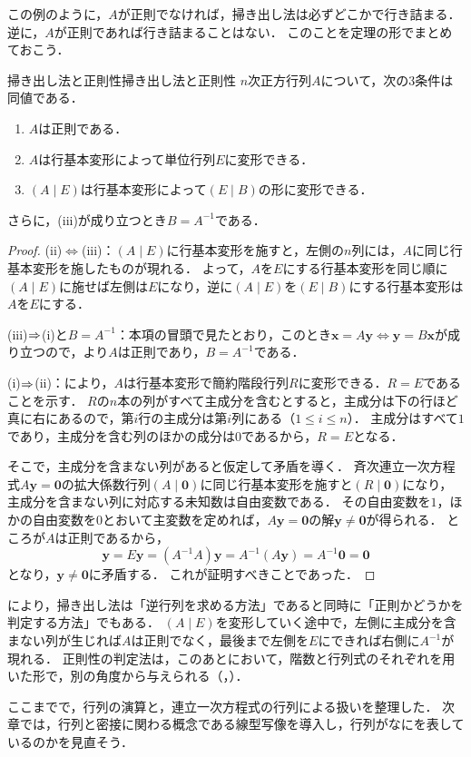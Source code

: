 この例のように，$A$が正則でなければ，掃き出し法は必ずどこかで行き詰まる．
逆に，$A$が正則であれば行き詰まることはない．
このことを定理の形でまとめておこう．

\begin{theorem}{掃き出し法と正則性}{掃き出し法と正則性}
  $n$次正方行列$A$について，次の$3$条件は同値である．
  \begin{enumerate}[label=(\roman*),leftmargin=3.2em]
    \item $A$は正則である．
    \item $A$は行基本変形によって単位行列$E$に変形できる．
    \item $(A \mid E)$は行基本変形によって$(E \mid B)$の形に変形できる．
  \end{enumerate}
  さらに，(iii)が成り立つとき$B = A^{-1}$である．
\end{theorem}

\begin{tleftbar}
\begin{proof}
  (ii)$\iff$(iii)：$(A \mid E)$に行基本変形を施すと，左側の$n$列には，$A$に同じ行基本変形を施したものが現れる．
  よって，$A$を$E$にする行基本変形を同じ順に$(A \mid E)$に施せば左側は$E$になり，逆に$(A \mid E)$を$(E \mid B)$にする行基本変形は$A$を$E$にする．

  (iii)$\mathrel{\Rightarrow}$(i)と$B = A^{-1}$：本項の冒頭で見たとおり，このとき$\bm{x} = A\bm{y} \iff \bm{y} = B\bm{x}$が成り立つので，より$A$は正則であり，$B = A^{-1}$である．

  (i)$\mathrel{\Rightarrow}$(ii)：により，$A$は行基本変形で簡約階段行列$R$に変形できる．$R = E$であることを示す．
  $R$の$n$本の列がすべて主成分を含むとすると，主成分は下の行ほど真に右にあるので，第$i$行の主成分は第$i$列にある（$1 \le i \le n$）．
  主成分はすべて$1$であり，主成分を含む列のほかの成分は$0$であるから，$R = E$となる．

  そこで，主成分を含まない列があると仮定して矛盾を導く．
  斉次連立一次方程式$A\bm{y} = \bm{0}$の拡大係数行列$(A \mid \bm{0})$に同じ行基本変形を施すと$(R \mid \bm{0})$になり，主成分を含まない列に対応する未知数は自由変数である．
  その自由変数を$1$，ほかの自由変数を$0$とおいて主変数を定めれば，$A\bm{y} = \bm{0}$の解$\bm{y} \ne \bm{0}$が得られる．
  ところが$A$は正則であるから，
  \[
    \bm{y} = E\bm{y} = (A^{-1}A)\bm{y} = A^{-1}(A\bm{y}) = A^{-1}\bm{0} = \bm{0}
  \]
  となり，$\bm{y} \ne \bm{0}$に矛盾する．
  これが証明すべきことであった．
\end{proof}
\end{tleftbar}

により，掃き出し法は「逆行列を求める方法」であると同時に「正則かどうかを判定する方法」でもある．
$(A \mid E)$を変形していく途中で，左側に主成分を含まない列が生じれば$A$は正則でなく，最後まで左側を$E$にできれば右側に$A^{-1}$が現れる．
正則性の判定法は，このあとにおいて，階数と行列式のそれぞれを用いた形で，別の角度から与えられる（，）．

ここまでで，行列の演算と，連立一次方程式の行列による扱いを整理した．
次章では，行列と密接に関わる概念である線型写像を導入し，行列がなにを表しているのかを見直そう．
